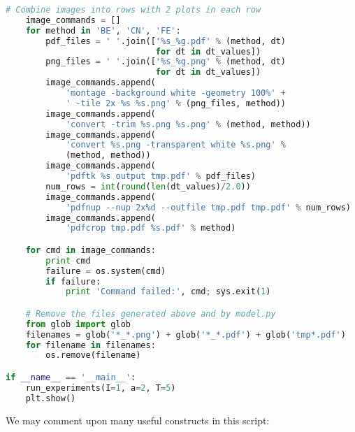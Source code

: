 \documentclass[graybox,sectrefs,envcountresetchap,open=right,final]{svmonodo}
\begin{document}
\begin{lstlisting}[language=python,style=blue1bar_bluegreen]
    # Combine images into rows with 2 plots in each row
    image_commands = []
    for method in 'BE', 'CN', 'FE':
        pdf_files = ' '.join(['%s_%g.pdf' % (method, dt)
                              for dt in dt_values])
        png_files = ' '.join(['%s_%g.png' % (method, dt)
                              for dt in dt_values])
        image_commands.append(
            'montage -background white -geometry 100%' +
            ' -tile 2x %s %s.png' % (png_files, method))
        image_commands.append(
            'convert -trim %s.png %s.png' % (method, method))
        image_commands.append(
            'convert %s.png -transparent white %s.png' %
            (method, method))
        image_commands.append(
            'pdftk %s output tmp.pdf' % pdf_files)
        num_rows = int(round(len(dt_values)/2.0))
        image_commands.append(
            'pdfnup --nup 2x%d --outfile tmp.pdf tmp.pdf' % num_rows)
        image_commands.append(
            'pdfcrop tmp.pdf %s.pdf' % method)

    for cmd in image_commands:
        print cmd
        failure = os.system(cmd)
        if failure:
            print 'Command failed:', cmd; sys.exit(1)

    # Remove the files generated above and by model.py
    from glob import glob
    filenames = glob('*_*.png') + glob('*_*.pdf') + glob('tmp*.pdf')
    for filename in filenames:
        os.remove(filename)

if __name__ == '__main__':
    run_experiments(I=1, a=2, T=5)
    plt.show()

\end{lstlisting}


 

We may comment upon many useful constructs in this script:
\end{document}
